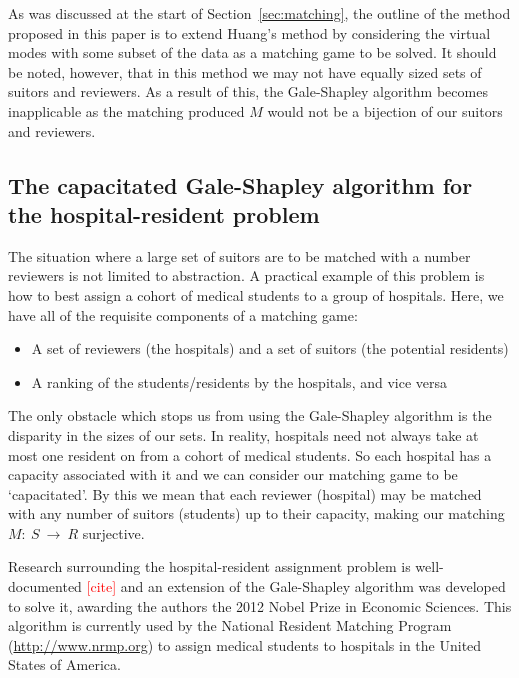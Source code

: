 As was discussed at the start of Section~\ref{sec:matching}, the outline of
the method proposed in this paper is to extend Huang's method by considering the
virtual modes with some subset of the data as a matching game to be solved. It
should be noted, however, that in this method we may not have equally sized 
sets of suitors and reviewers. As a result of this, the Gale-Shapley algorithm 
becomes inapplicable as the matching produced \(M\) would not be a bijection of 
our suitors and reviewers.

\subsection{The capacitated Gale-Shapley algorithm for the hospital-resident 
	problem}\label{subsec:capacitated_galeshapley}

The situation where a large set of suitors are to be matched with a number
reviewers is not limited to abstraction. A practical example of this problem is
how to best assign a cohort of medical students to a group of hospitals. Here, 
we have all of the requisite components of a matching game:

\begin{itemize}
	\item A set of reviewers (the hospitals) and a set of suitors (the potential
        residents) 
	\item A ranking of the students/residents by the hospitals, and vice versa
\end{itemize}

The only obstacle which stops us from using the Gale-Shapley algorithm is the 
disparity in the sizes of our sets. In reality, hospitals need not always take 
at most one resident on from a cohort of medical students. So each hospital has
a capacity associated with it and we can consider our matching game to be
`capacitated'. By this we mean that each reviewer (hospital) may be matched with
any number of suitors (students) up to their capacity, making our matching
\(M:~S~\to~R\) surjective.

Research surrounding the hospital-resident assignment problem is well-documented 
\textcolor{red}{[cite]} and an extension of the Gale-Shapley algorithm was
developed to solve it, awarding the authors the 2012 Nobel Prize in Economic
Sciences. This algorithm is currently used by the National Resident Matching
Program (\url{http://www.nrmp.org}) to assign medical students to hospitals in
the United States of America.

